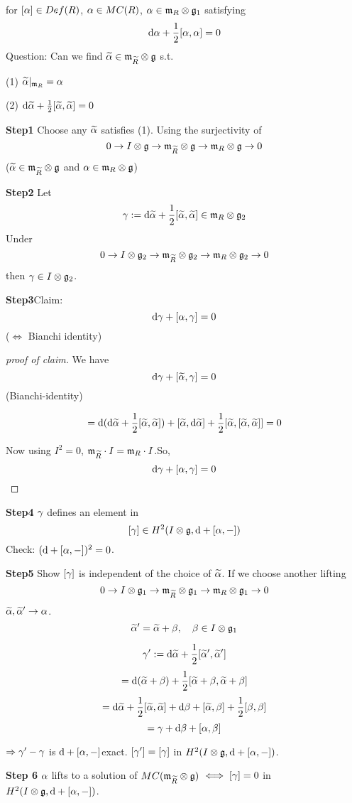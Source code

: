 for $[\alpha]\in Def(R)$, $\alpha\in MC(R)$,
$\alpha\in\mathfrak{m}_R\otimes\mathfrak{g}_1$ satisfying
$$\mathrm{d} \alpha+\frac{1}{2}[\alpha,\alpha]=0$$
Question: Can we find $\widetilde{\alpha}\in\mathfrak{m}_{\widetilde{R}}\otimes\mathfrak{g}$ s.t.

(1) $\widetilde{\alpha}|_{\mathfrak{m}_R}=\alpha$

(2) $\mathrm{d}\widetilde{\alpha}+\frac{1}{2}[\widetilde{\alpha},\widetilde{\alpha}]=0$

\textbf{Step1} Choose any $\widetilde{\alpha}$ satisfies (1).
Using the surjectivity of
$$0\to I\otimes\mathfrak{g}\to\mathfrak{m}_{\widetilde{R}}\otimes\mathfrak{g}\to\mathfrak{m}_R\otimes\mathfrak{g}\to 0$$
($\widetilde{\alpha}\in \mathfrak{m}_{\widetilde{R}}\otimes\mathfrak{g}$ and $\alpha\in \mathfrak{m}_R\otimes\mathfrak{g}$)

\textbf{Step2} Let
$$\gamma:=\mathrm{d}\widetilde{\alpha}+\frac{1}{2}[\widetilde{\alpha},\widetilde{\alpha}]\in\mathfrak{m}_R\otimes\mathfrak{g}_2$$
Under
$$0\to I\otimes\mathfrak{g}_2\to\mathfrak{m}_{\widetilde{R}}\otimes\mathfrak{g}_2\to\mathfrak{m}_R\otimes\mathfrak{g}_2\to 0$$
then $\gamma\in I\otimes\mathfrak{g}_2$.

\textbf{Step3}Claim:
$$\mathrm{d}\gamma+[\alpha,\gamma]=0$$
($\iff$ Bianchi identity)

\begin{proof}[proof of claim]
We have
$$\mathrm{d}\gamma+[\widetilde{\alpha},\gamma]=0$$
(Bianchi-identity)

$$
  =\mathrm{d}(\mathrm{d}\widetilde{\alpha}+\frac{1}{2}[\widetilde{\alpha},\widetilde{\alpha}])+[\widetilde{\alpha},\mathrm{d}\widetilde{\alpha}]
   +\frac{1}{2}[\widetilde{\alpha},[\widetilde{\alpha},\widetilde{\alpha}]]
  =0
$$

Now using $I^2=0$,
$\mathfrak{m}_{\widetilde{R}}\cdot I=\mathfrak{m}_R\cdot I$.So,
$$\mathrm{d}\gamma+[\alpha,\gamma]=0$$
\end{proof}

\textbf{Step4} $\gamma$ defines an element in
$$[\gamma]\in H^2(I\otimes\mathfrak{g},\mathrm{d}+[\alpha,-])$$
Check: $(\mathrm{d}+[\alpha,-])^2=0$.

\textbf{Step5} Show $[\gamma]$ is independent of the choice of $\widetilde{\alpha}$.
If we choose another lifting
$$
  0\to I\otimes\mathfrak{g}_1\to\mathfrak{m}_{\widetilde{R}}\otimes\mathfrak{g}_1
  \to\mathfrak{m}_R\otimes\mathfrak{g}_1\to 0
$$
$\widetilde{\alpha},\widetilde{\alpha}'\to\alpha$.
$$\widetilde{\alpha}'=\widetilde{\alpha}+\beta,\quad\beta\in I\otimes\mathfrak{g}_1$$

$$\gamma':=\mathrm{d}\widetilde{\alpha}+\frac{1}{2}[\widetilde{\alpha}',\widetilde{\alpha}']$$
$$=\mathrm{d}(\widetilde{\alpha}+\beta)+\frac{1}{2}[\widetilde{\alpha}+\beta,\widetilde{\alpha}+\beta]$$
$$=\mathrm{d}\widetilde{\alpha}+\frac{1}{2}[\widetilde{\alpha},\widetilde{\alpha}]+\mathrm{d}\beta+[\widetilde{\alpha},\beta]+\frac{1}{2}[\beta,\beta]$$
$$=\gamma+\mathrm{d}\beta+[\alpha,\beta]$$

$\Rightarrow \gamma'-\gamma$ is $\mathrm{d}+[\alpha,-]$exact.
$[\gamma']=[\gamma]$ in $H^2(I\otimes\mathfrak{g},\mathrm{d}+[\alpha,-])$.

\textbf{Step 6} $\alpha$ lifts to a solution of $MC(\mathfrak{m}_{\widetilde{R}}\otimes\mathfrak{g})$
$\iff[\gamma]=0$ in $H^2(I\otimes\mathfrak{g},\mathrm{d}+[\alpha,-])$.

